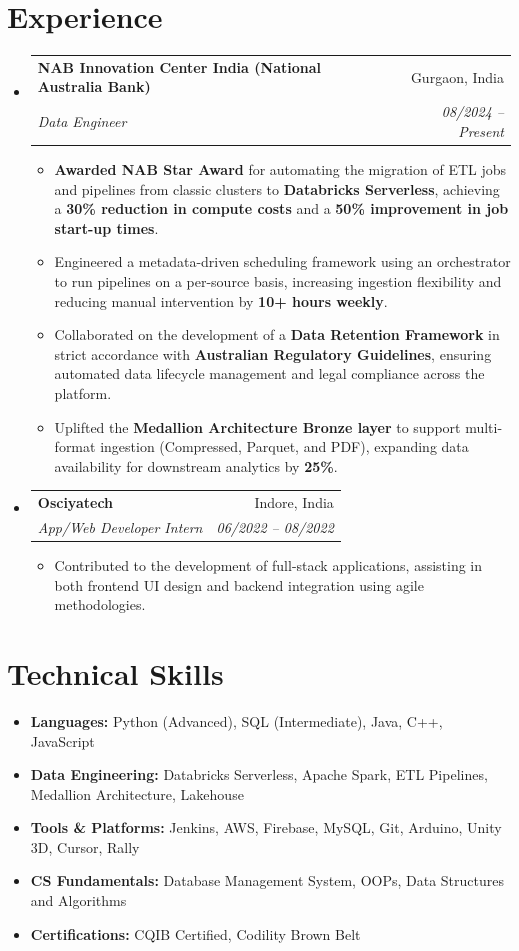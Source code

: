 \documentclass[10pt, a4paper]{article}
\makeatletter
\newcommand{\resumeItem}[1]{\item\small{#1 \vspace{-2pt}}}
\newcommand{\resumeSubheading}[4]{
  \vspace{-1pt}\item
    \begin{tabular*}{0.97\textwidth}[t]{l@{\extracolsep{\fill}}r}
      \textbf{#1} & #2 \\
      \textit{\small#3} & \textit{\small #4} \\
    \end{tabular*}\vspace{-5pt}
}
\makeatother
\begin{document}
\section*{Experience}
\begin{itemize}[leftmargin=0.15in, label={}]

  \resumeSubheading
    {NAB Innovation Center India (National Australia Bank)}{Gurgaon, India}
    {Data Engineer}{08/2024 -- Present}
    \begin{itemize}[leftmargin=0.15in, label=\textbullet]
        \resumeItem{\textbf{Awarded NAB Star Award} for automating the migration of ETL jobs and pipelines from classic clusters to \textbf{Databricks Serverless}, achieving a \textbf{30\% reduction in compute costs} and a \textbf{50\% improvement in job start-up times}.}
        \resumeItem{Engineered a metadata-driven scheduling framework using an orchestrator to run pipelines on a per-source basis, increasing ingestion flexibility and reducing manual intervention by \textbf{10+ hours weekly}.}
        \resumeItem{Collaborated on the development of a \textbf{Data Retention Framework} in strict accordance with \textbf{Australian Regulatory Guidelines}, ensuring automated data lifecycle management and legal compliance across the platform.}
        \resumeItem{Uplifted the \textbf{Medallion Architecture Bronze layer} to support multi-format ingestion (Compressed, Parquet, and PDF), expanding data availability for downstream analytics by \textbf{25\%}.}
    \end{itemize}

  \resumeSubheading
    {Osciyatech}{Indore, India}
    {App/Web Developer Intern}{06/2022 -- 08/2022}
    \begin{itemize}[leftmargin=0.15in, label=\textbullet]
        \resumeItem{Contributed to the development of full-stack applications, assisting in both frontend UI design and backend integration using agile methodologies.}
    \end{itemize}

\end{itemize}

\section*{Technical Skills}
\begin{itemize}[leftmargin=0.15in, label={}, itemsep=4pt, parsep=0pt]
    \small
    \item \textbf{Languages:} Python (Advanced), SQL (Intermediate), Java, C++, JavaScript
    \item \textbf{Data Engineering:} Databricks Serverless, Apache Spark, ETL Pipelines, Medallion Architecture, Lakehouse
    \item \textbf{Tools \& Platforms:} Jenkins, AWS, Firebase, MySQL, Git, Arduino, Unity 3D, Cursor, Rally
    \item \textbf{CS Fundamentals:} Database Management System, OOPs, Data Structures and Algorithms
    \item \textbf{Certifications:} CQIB Certified, Codility Brown Belt
\end{itemize}
\end{document}
